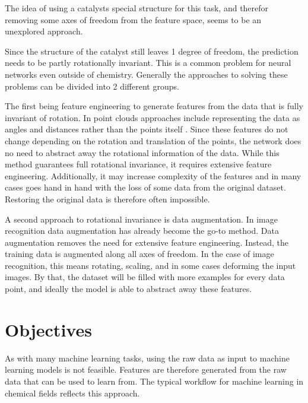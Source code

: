 The idea of using a catalysts special structure for this task, and therefor removing some axes of freedom from the feature space, seems to be an unexplored approach.

Since the structure of the catalyst still leaves 1 degree of freedom, the prediction needs to be partly rotationally invariant.
This is a common problem for neural networks even outside of chemistry.
Generally the approaches to solving these problems can be divided into 2 different groups.

The first being feature engineering to generate features from the data that is fully invariant of rotation.
In point clouds approaches include representing the data as angles and distances rather than the points itself \cite{weiler20183d, 8886052}.
Since these features do not change depending on the rotation and translation of the points, the network does no need to 
abstract away the rotational information of the data.
While this method guarantees full rotational invariance, it requires extensive feature engineering.
Additionally, it may increase complexity of the features and in many cases 
goes hand in hand with the loss of some data from the original dataset. 
Restoring the original data is therefore often impossible.

A second approach to rotational invariance is data augmentation.
In image recognition data augmentation has already become the go-to method.
Data augmentation removes the need for extensive feature engineering.
Instead, the training data is augmented along all axes of freedom.
In the case of image recognition, this means rotating, scaling, and in some cases deforming the input images.
By that, the dataset will be filled with more examples for every data point, and ideally the model is able to 
abstract away these features. %

\section{Objectives}

As with many machine learning tasks, using the raw data as input to machine learning models is not feasible.
Features are therefore generated from the raw data that can be used to learn from.
The typical workflow for machine learning in chemical fields reflects this approach.

